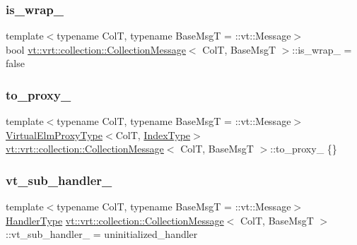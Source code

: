 \subsubsection{\texorpdfstring{is\+\_\+wrap\+\_\+}{is\_wrap\_}}
{\footnotesize\ttfamily template$<$typename ColT, typename Base\+MsgT = \+::vt\+::\+Message$>$ \\
bool \hyperlink{structvt_1_1vrt_1_1collection_1_1_collection_message}{vt\+::vrt\+::collection\+::\+Collection\+Message}$<$ ColT, Base\+MsgT $>$\+::is\+\_\+wrap\+\_\+ = false\hspace{0.3cm}{\ttfamily [private]}}

\mbox{\label{structvt_1_1vrt_1_1collection_1_1_collection_message_ad2fbe6becd494f4983479600010ec39b}} 
\subsubsection{\texorpdfstring{to\+\_\+proxy\+\_\+}{to\_proxy\_}}
{\footnotesize\ttfamily template$<$typename ColT, typename Base\+MsgT = \+::vt\+::\+Message$>$ \\
\hyperlink{namespacevt_1_1vrt_a620a5c8c59d13e513f690c74b4af516f}{Virtual\+Elm\+Proxy\+Type}$<$ColT, \hyperlink{structvt_1_1vrt_1_1collection_1_1_collection_message_a324978c38e67d1bfa86c8db172e77594}{Index\+Type}$>$ \hyperlink{structvt_1_1vrt_1_1collection_1_1_collection_message}{vt\+::vrt\+::collection\+::\+Collection\+Message}$<$ ColT, Base\+MsgT $>$\+::to\+\_\+proxy\+\_\+ \{\}\hspace{0.3cm}{\ttfamily [private]}}

\mbox{\label{structvt_1_1vrt_1_1collection_1_1_collection_message_a6886f8da35617183db4aa87b259ec7df}} 
\subsubsection{\texorpdfstring{vt\+\_\+sub\+\_\+handler\+\_\+}{vt\_sub\_handler\_}}
{\footnotesize\ttfamily template$<$typename ColT, typename Base\+MsgT = \+::vt\+::\+Message$>$ \\
\hyperlink{namespacevt_af64846b57dfcaf104da3ef6967917573}{Handler\+Type} \hyperlink{structvt_1_1vrt_1_1collection_1_1_collection_message}{vt\+::vrt\+::collection\+::\+Collection\+Message}$<$ ColT, Base\+MsgT $>$\+::vt\+\_\+sub\+\_\+handler\+\_\+ = uninitialized\+\_\+handler\hspace{0.3cm}{\ttfamily [private]}}



